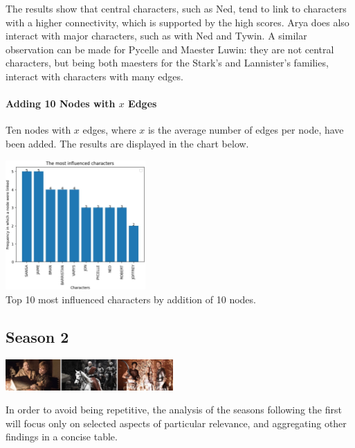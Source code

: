 \documentclass[10pt,twocolumn,letterpaper]{article}
\begin{document}
The results show that central characters, such as Ned, tend to link to characters with a higher connectivity, which is supported by the high scores. Arya does also interact with major characters, such as with Ned and Tywin. A similar observation can be made for Pycelle and Maester Luwin: they are not central characters, but being both maesters for the Stark's and Lannister's families, interact with characters with many edges.

\paragraph{Adding 10 Nodes with $x$ Edges}
Ten nodes with $x$ edges, where $x$ is the average number of edges per node, have been added. The results are displayed in the chart below.

\begin{center}
    \includegraphics[width=0.4\textwidth]{img/s1/link_pred_chart.jpg}
    \vspace{0.2cm}\\
    \caption{Top 10 most influenced characters by addition of 10 nodes.}
\end{center}





\subsection{Season 2}

\begin{center}
    \includegraphics[width=0.48\textwidth]{img/s2/frames_s2.jpg}
\end{center}

In order to avoid being repetitive, the analysis of the seasons following the first will focus only on selected aspects of particular relevance, and aggregating other findings in a concise table.
\end{document}
